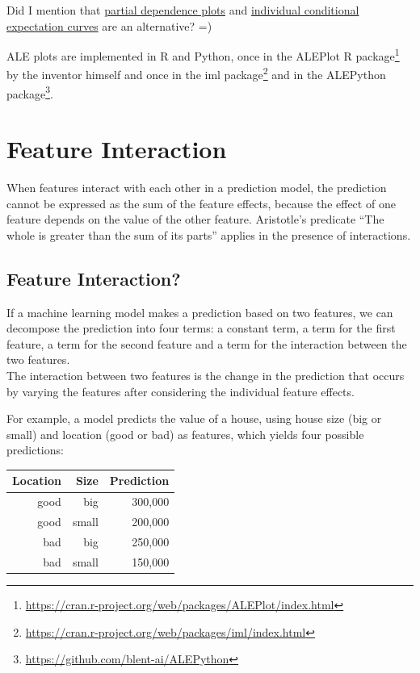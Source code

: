 \documentclass[
  12pt,
]{krantz}
\renewcommand{\href}[2]{#2\footnote{\url{#1}}}
\begin{document}
Did I mention that \protect\hyperlink{pdp}{partial dependence plots} and \protect\hyperlink{ice}{individual conditional expectation curves} are an alternative? =)

ALE plots are implemented in R and Python, once in the \href{https://cran.r-project.org/web/packages/ALEPlot/index.html}{ALEPlot R package} by the inventor himself and once in the \href{https://cran.r-project.org/web/packages/iml/index.html}{iml package} and in the \href{https://github.com/blent-ai/ALEPython}{ALEPython package}.

\newpage

\hypertarget{interaction}{%
\section{Feature Interaction}\label{interaction}}

When features interact with each other in a prediction model, the prediction cannot be expressed as the sum of the feature effects, because the effect of one feature depends on the value of the other feature.
Aristotle's predicate ``The whole is greater than the sum of its parts'' applies in the presence of interactions.

\hypertarget{feature-interaction}{%
\subsection{Feature Interaction?}\label{feature-interaction}}

If a machine learning model makes a prediction based on two features, we can decompose the prediction into four terms:
a constant term, a term for the first feature, a term for the second feature and a term for the interaction between the two features.\\
The interaction between two features is the change in the prediction that occurs by varying the features after considering the individual feature effects.

For example, a model predicts the value of a house, using house size (big or small) and location (good or bad) as features, which yields four possible predictions:

\begin{longtable}[]{@{}rrr@{}}
\toprule
Location & Size & Prediction\tabularnewline
\midrule
\endhead
good & big & 300,000\tabularnewline
good & small & 200,000\tabularnewline
bad & big & 250,000\tabularnewline
bad & small & 150,000\tabularnewline
\bottomrule
\end{longtable}
\end{document}
